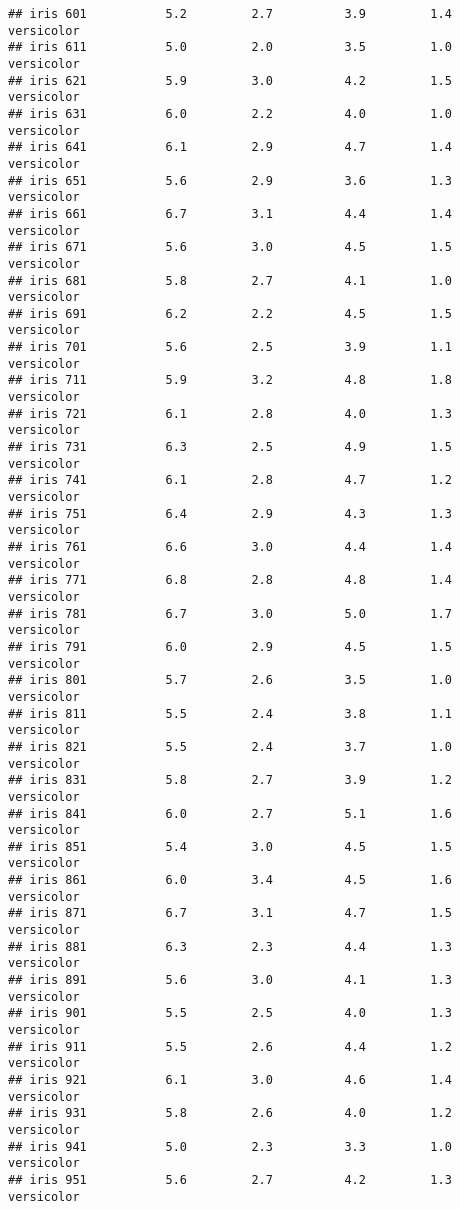 \documentclass[
]{article}
\begin{document}
\begin{verbatim}
## iris 601           5.2         2.7          3.9         1.4 versicolor
## iris 611           5.0         2.0          3.5         1.0 versicolor
## iris 621           5.9         3.0          4.2         1.5 versicolor
## iris 631           6.0         2.2          4.0         1.0 versicolor
## iris 641           6.1         2.9          4.7         1.4 versicolor
## iris 651           5.6         2.9          3.6         1.3 versicolor
## iris 661           6.7         3.1          4.4         1.4 versicolor
## iris 671           5.6         3.0          4.5         1.5 versicolor
## iris 681           5.8         2.7          4.1         1.0 versicolor
## iris 691           6.2         2.2          4.5         1.5 versicolor
## iris 701           5.6         2.5          3.9         1.1 versicolor
## iris 711           5.9         3.2          4.8         1.8 versicolor
## iris 721           6.1         2.8          4.0         1.3 versicolor
## iris 731           6.3         2.5          4.9         1.5 versicolor
## iris 741           6.1         2.8          4.7         1.2 versicolor
## iris 751           6.4         2.9          4.3         1.3 versicolor
## iris 761           6.6         3.0          4.4         1.4 versicolor
## iris 771           6.8         2.8          4.8         1.4 versicolor
## iris 781           6.7         3.0          5.0         1.7 versicolor
## iris 791           6.0         2.9          4.5         1.5 versicolor
## iris 801           5.7         2.6          3.5         1.0 versicolor
## iris 811           5.5         2.4          3.8         1.1 versicolor
## iris 821           5.5         2.4          3.7         1.0 versicolor
## iris 831           5.8         2.7          3.9         1.2 versicolor
## iris 841           6.0         2.7          5.1         1.6 versicolor
## iris 851           5.4         3.0          4.5         1.5 versicolor
## iris 861           6.0         3.4          4.5         1.6 versicolor
## iris 871           6.7         3.1          4.7         1.5 versicolor
## iris 881           6.3         2.3          4.4         1.3 versicolor
## iris 891           5.6         3.0          4.1         1.3 versicolor
## iris 901           5.5         2.5          4.0         1.3 versicolor
## iris 911           5.5         2.6          4.4         1.2 versicolor
## iris 921           6.1         3.0          4.6         1.4 versicolor
## iris 931           5.8         2.6          4.0         1.2 versicolor
## iris 941           5.0         2.3          3.3         1.0 versicolor
## iris 951           5.6         2.7          4.2         1.3 versicolor

\end{verbatim}
\end{document}

